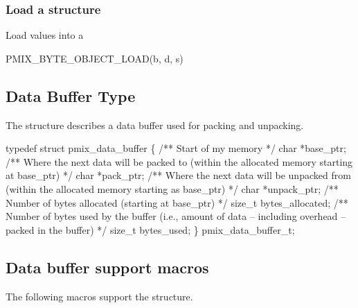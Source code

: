 \begin{arglist}
\end{arglist}

\subsubsection{Load a structure}

Load values into a 

\cspecificstart
\begin{codepar}
PMIX_BYTE_OBJECT_LOAD(b, d, s)
\end{codepar}
\cspecificend

\begin{arglist}
\end{arglist}


\subsection{Data Buffer Type}

The  structure describes a data buffer used for packing and unpacking.

\cspecificstart
\begin{codepar}
typedef struct pmix_data_buffer \{
    /** Start of my memory */
    char *base_ptr;
    /** Where the next data will be packed to
        (within the allocated memory starting
        at base_ptr) */
    char *pack_ptr;
    /** Where the next data will be unpacked
        from (within the allocated memory
        starting as base_ptr) */
    char *unpack_ptr;
    /** Number of bytes allocated (starting
        at base_ptr) */
    size_t bytes_allocated;
    /** Number of bytes used by the buffer
        (i.e., amount of data -- including
        overhead -- packed in the buffer) */
    size_t bytes_used;
\} pmix_data_buffer_t;
\end{codepar}
\cspecificend

\subsection{Data buffer support macros}
The following macros support the  structure.

